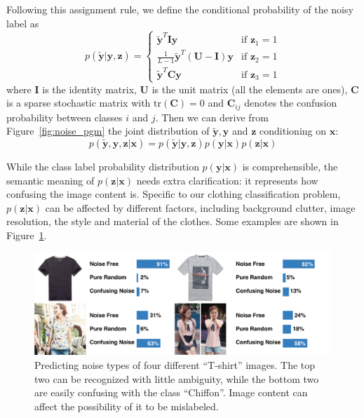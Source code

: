 \documentclass[10pt,twocolumn,letterpaper]{article}
\def\vec{\mathbf}
\def\mat{\mathbf}
\begin{document}
Following this assignment rule, we define the conditional probability of the noisy label as
\begin{equation} \label{eq:likelihood}
    p(\tilde{\vec{y}}|\vec{y},\vec{z}) = \begin{cases}
        \tilde{\vec{y}}^{T}\mat{I}\vec{y} & \text{if } \vec{z}_1 = 1 \\
        \frac{1}{L-1}\tilde{\vec{y}}^{T}(\mat{U} - \mat{I})\vec{y} & \text{if } \vec{z}_2 = 1 \\
        \tilde{\vec{y}}^{T}\mat{C}\vec{y} & \text{if } \vec{z}_3 = 1
    \end{cases}
\end{equation}
where $\mat{I}$ is the identity matrix, $\mat{U}$ is the unit matrix (all the elements are ones), $\mat{C}$ is a sparse stochastic matrix with $\mathrm{tr}(\mat{C})=0$ and $\mat{C}_{ij}$ denotes the confusion probability between classes $i$ and $j$. Then we can derive from Figure~\ref{fig:noise_pgm} the joint distribution of $\tilde{\vec{y}}, \vec{y}$ and $\vec{z}$ conditioning on $\vec{x}$:
\begin{equation} \label{eq:joint_distribution}
  p(\tilde{\vec{y}}, \vec{y}, \vec{z} | \vec{x}) = p(\tilde{\vec{y}} | \vec{y}, \vec{z}) p(\vec{y} | \vec{x}) p(\vec{z} | \vec{x})
\end{equation}

While the class label probability distribution $p(\vec{y} | \vec{x})$ is comprehensible, the semantic meaning of $p(\vec{z} | \vec{x})$ needs extra clarification: it represents how confusing the image content is. Specific to our clothing classification problem, $p(\vec{z} | \vec{x})$ can be affected by different factors, including background clutter, image resolution, the style and material of the clothes. Some examples are shown in Figure~\ref{fig:compare_noise_level}.

\begin{figure}[t]
\begin{center}
\includegraphics[width=1.0\linewidth]{figure/noise_level.pdf}
\end{center}
\caption{Predicting noise types of four different ``T-shirt'' images. The top two can be recognized with little ambiguity, while the bottom two are easily confusing with the class ``Chiffon''. Image content can affect the possibility of it to be mislabeled.}
\label{fig:compare_noise_level}
\end{figure}
\end{document}
